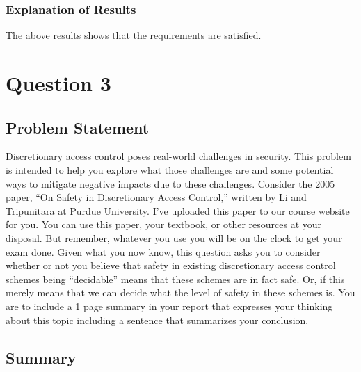 \documentclass{report}
\begin{document}
\subsection{Explanation of Results}
\label{sec:explanation-results-2}
The above results shows that the requirements are satisfied.



 \chapter{Question 3}
 \label{cha:exercise-11.6.3}
  
 \section{Problem Statement}
 \label{sec:problem-statement-3}

Discretionary access control poses real-world challenges in security. This problem is 
intended to help you explore what those challenges are and some potential ways to mitigate
negative impacts due to these challenges. Consider the 2005 paper, “On Safety in Discretionary
Access Control,” written by Li and Tripunitara at Purdue University. I’ve uploaded this paper to
our course website for you. You can use this paper, your textbook, or other resources at your
disposal. But remember, whatever you use you will be on the clock to get your exam done.
Given what you now know, this question asks you to consider whether or not you believe
that safety in existing discretionary access control schemes being “decidable” means that these
schemes are in fact safe. Or, if this merely means that we can decide what the level of safety in
these schemes is. You are to include a 1 page summary in your report that expresses your
thinking about this topic including a sentence that summarizes your conclusion.

\section{Summary}
\label{sec:summary-3}
\end{document}
